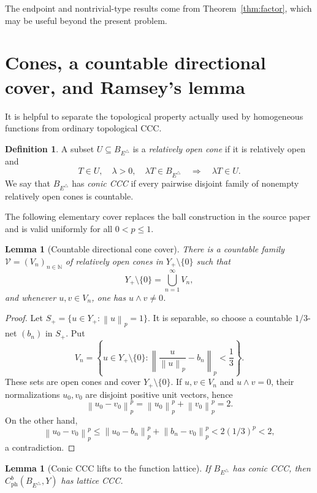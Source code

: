 \documentclass[11pt]{article}
\newtheorem{lemma}[theorem]{Lemma}
\theoremstyle{definition}
\newtheorem{definition}[theorem]{Definition}
\newcommand{\N}{\mathbb N}
\newcommand{\cph}{C_{\mathrm{ph}}^b}
\newcommand{\calV}{\mathcal V}
\newcommand{\norm}[1]{\left\lVert #1\right\rVert}
\begin{document}
The endpoint and nontrivial-type results come from Theorem~\ref{thm:factor},
which may be useful beyond the present problem.

\section{Cones, a countable directional cover, and Ramsey's lemma}

It is helpful to separate the topological property actually used by homogeneous
functions from ordinary topological CCC.

\begin{definition}
A subset $U\subseteq B_{E^\triangle}$ is a \emph{relatively open cone} if it is
relatively open and
\[
 T\in U,\quad \lambda>0,\quad \lambda T\in B_{E^\triangle}
 \quad\Longrightarrow\quad \lambda T\in U.
\]
We say that $B_{E^\triangle}$ has \emph{conic CCC} if every pairwise disjoint
family of nonempty relatively open cones is countable.
\end{definition}

The following elementary cover replaces the ball construction in the source
paper and is valid uniformly for all $0<p\leq1$.

\begin{lemma}[Countable directional cone cover]
\label{lem:cone-cover}
There is a countable family $\calV=(V_n)_{n\in\N}$ of relatively open cones in
$Y_+\setminus\{0\}$ such that
\[
 Y_+\setminus\{0\}=\bigcup_{n=1}^\infty V_n,
\]
and whenever $u,v\in V_n$, one has $u\wedge v\neq0$.
\end{lemma}

\begin{proof}
Let $S_+=\{u\in Y_+:\norm{u}_p=1\}$.  It is separable, so choose a countable
$1/3$-net $(b_n)$ in $S_+$.  Put
\[
 V_n=\left\{u\in Y_+\setminus\{0\}:
 \norm{\frac{u}{\norm{u}_p}-b_n}_p<\frac13\right\}.
\]
These sets are open cones and cover $Y_+\setminus\{0\}$.  If $u,v\in V_n$ and
$u\wedge v=0$, their normalizations $u_0,v_0$ are disjoint positive unit
vectors, hence
\[
 \norm{u_0-v_0}_p^p=\norm{u_0}_p^p+\norm{v_0}_p^p=2.
\]
On the other hand,
\[
 \norm{u_0-v_0}_p^p
 \leq \norm{u_0-b_n}_p^p+\norm{b_n-v_0}_p^p
 <2(1/3)^p<2,
\]
a contradiction.
\end{proof}

\begin{lemma}[Conic CCC lifts to the function lattice]
\label{lem:conic-lift}
If $B_{E^\triangle}$ has conic CCC, then
$\cph(B_{E^\triangle},Y)$ has lattice CCC.
\end{lemma}
\end{document}
